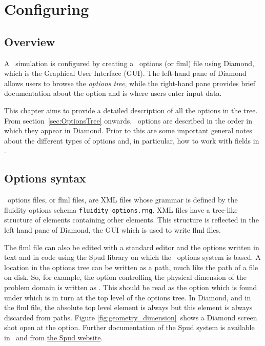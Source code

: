 \chapter{Configuring \fluidity}\label{chap:configuration}

\section{Overview}
A \fluidity\ simulation is configured by creating a \fluidity\ options (or flml) file using
Diamond, which is the Graphical User Interface (GUI).
The left-hand pane of Diamond allows users to browse the
\emph{options tree}, while the right-hand pane provides brief documentation
about the option and is where users enter input data.

This chapter aims to provide a detailed description of all the options in
the tree.  From section~\ref{sec:OptionsTree} onwards, \fluidity\ options are
described in the order in which they appear in Diamond.  Prior to this are
some important general notes about the different types of options and, in
particular, how to work with fields in \fluidity.

\section{Options syntax}
\fluidity\ options files, or flml files, are XML files whose grammar is defined by the
fluidity options schema \verb+fluidity_options.rng+. XML files have a
tree-like structure of elements containing other elements. This structure is
reflected in the left hand pane of Diamond, the GUI which
is used to write flml files.

The flml file can also be edited with a standard editor and the options written
in text and in code using the Spud library on which the \fluidity\ options
system is based. A location in the options tree can be written as a path,
much like the path of a file on disk. So, for example, the option
controlling the physical dimension of the problem domain is written as
. This should be read as the 
option which is found under  which is in turn at the top
level of the options tree. In Diamond, and in the flml file, the absolute
top level element is always  but this element is
always discarded from paths. Figure \ref{fig:geometry_dimension}\ shows a
Diamond screen shot open at the  option. Further
documentation of the Spud system is available in \citet{ham2009}\ and from
\href{http://amcg.ese.ic.ac.uk/spud}{the Spud website}.

